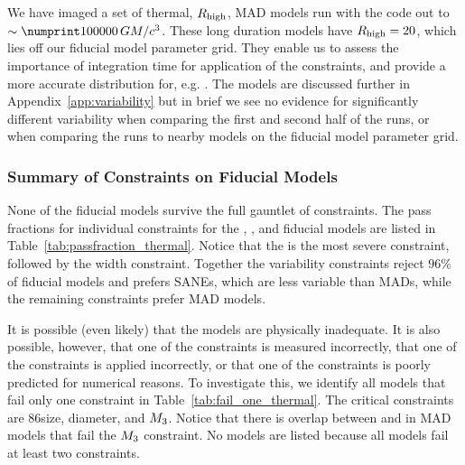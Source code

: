 We have imaged a set of thermal, $R_\mathrm{high}$, MAD models run with the \koral code out to $\sim \no{100000}\,\tg$.  These long duration  models have $R_\mathrm{high} = 20$, which lies off our fiducial model parameter grid.  They enable us to assess the importance of integration time for application of the constraints, and provide a more accurate distribution for, e.g. .  The models are discussed further in Appendix~\ref{app:variability} but in brief we see no evidence for significantly different variability when comparing the first and second half of the \koral runs, or when comparing the \koral runs to nearby models on the fiducial model parameter grid.  


\subsubsection{Summary of Constraints on Fiducial Models}
\label{sec:summarythermal}





None of the fiducial models  survive the full gauntlet of constraints.
The pass fractions for individual constraints for the \bhac, \kharma, and \hamr fiducial models are listed in Table~\ref{tab:passfraction_thermal}.
Notice that the  is the most severe constraint, followed by the \mring width constraint.
Together the variability constraints reject $96\%$ of fiducial models and prefers SANEs, which are less variable than MADs, while the remaining constraints prefer MAD models.

It is possible (even likely) that the models are physically inadequate.
It is also possible, however, that one of the constraints is measured incorrectly, that one of the constraints is applied incorrectly, or that one of the constraints is poorly predicted for numerical reasons.
To investigate this, we identify all models that fail only one constraint in Table~\ref{tab:fail_one_thermal}.
The critical constraints are 86\GHz size, \mring diameter, and $M_{3}$.
Notice that there is overlap between \kharma and \bhac in MAD models that fail the $M_{3}$ constraint.
No \hamr models are listed because all \hamr models fail at least two constraints.

